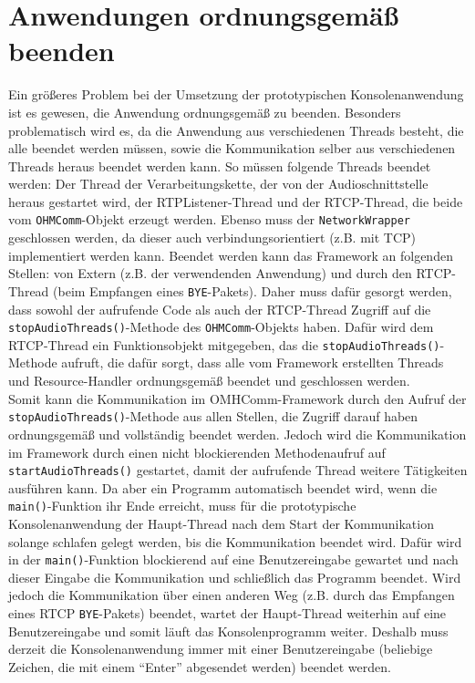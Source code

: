 \section{Anwendungen ordnungsgemäß beenden}
Ein größeres Problem bei der Umsetzung der prototypischen Konsolenanwendung ist es gewesen, die Anwendung ordnungsgemäß zu beenden. Besonders problematisch wird es, da die Anwendung aus verschiedenen Threads besteht, die alle beendet werden müssen, sowie die Kommunikation selber aus verschiedenen Threads heraus beendet werden kann. So müssen folgende Threads beendet werden: Der Thread der Verarbeitungskette, der von der Audioschnittstelle heraus gestartet wird, der RTPListener-Thread und der RTCP-Thread, die beide vom \texttt{OHMComm}-Objekt erzeugt werden. Ebenso muss der \texttt{NetworkWrapper} geschlossen werden, da dieser auch verbindungsorientiert (z.B. mit TCP) implementiert werden kann. Beendet werden kann das Framework an folgenden Stellen: von Extern (z.B. der verwendenden Anwendung) und durch den RTCP-Thread (beim Empfangen eines \texttt{BYE}-Pakets). Daher muss dafür gesorgt werden, dass sowohl der aufrufende Code als auch der RTCP-Thread Zugriff auf die \texttt{stopAudioThreads()}-Methode des \texttt{OHMComm}-Objekts haben. Dafür wird dem RTCP-Thread ein Funktionsobjekt mitgegeben, das die \texttt{stopAudioThreads()}-Methode aufruft, die dafür sorgt, dass alle vom Framework erstellten Threads und Resource-Handler ordnungsgemäß beendet und geschlossen werden.
\\
Somit kann die Kommunikation im OMHComm-Framework durch den Aufruf der \texttt{stopAudioThreads()}-Methode aus allen Stellen, die Zugriff darauf haben ordnungsgemäß und vollständig beendet werden. Jedoch wird die Kommunikation im Framework durch einen nicht blockierenden Methodenaufruf auf \texttt{startAudio\-Threads()} gestartet, damit der aufrufende Thread weitere Tätigkeiten ausführen kann. Da aber ein Programm automatisch beendet wird, wenn die \texttt{main()}-Funktion ihr Ende erreicht, muss für die prototypische Konsolenanwendung der Haupt-Thread nach dem Start der Kommunikation solange schlafen gelegt werden, bis die Kommunikation beendet wird. Dafür wird in der \texttt{main()}-Funktion blockierend auf eine Benutzereingabe gewartet und nach dieser Eingabe die Kommunikation und schließlich das Programm beendet. Wird jedoch die Kommunikation über einen anderen Weg (z.B. durch das Empfangen eines RTCP \texttt{BYE}-Pakets) beendet, wartet der Haupt-Thread weiterhin auf eine Benutzereingabe und somit läuft das Konsolenprogramm weiter. Deshalb muss derzeit die Konsolenanwendung immer mit einer Benutzereingabe (beliebige Zeichen, die mit einem \enquote{Enter} abgesendet werden) beendet werden.